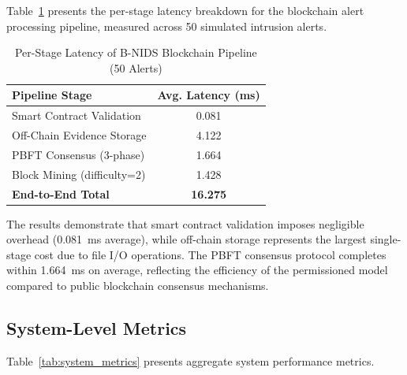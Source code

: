 \documentclass[conference]{IEEEtran}
\begin{document}
Table~\ref{tab:blockchain_latency} presents the per-stage latency breakdown for the blockchain alert processing pipeline, measured across 50 simulated intrusion alerts.

\begin{table}[t]
\centering
\caption{Per-Stage Latency of B-NIDS Blockchain Pipeline (50 Alerts)}
\label{tab:blockchain_latency}
\setlength{\tabcolsep}{4pt}
\begin{tabular}{|l|c|}
\hline
\textbf{Pipeline Stage} & \textbf{Avg. Latency (ms)} \\
\hline
Smart Contract Validation & 0.081 \\
Off-Chain Evidence Storage & 4.122 \\
PBFT Consensus (3-phase) & 1.664 \\
Block Mining (difficulty=2) & 1.428 \\
\hline
\textbf{End-to-End Total} & \textbf{16.275} \\
\hline
\end{tabular}
\end{table}

The results demonstrate that smart contract validation imposes negligible overhead (0.081~ms average), while off-chain storage represents the largest single-stage cost due to file I/O operations. The PBFT consensus protocol completes within 1.664~ms on average, reflecting the efficiency of the permissioned model compared to public blockchain consensus mechanisms.

\subsection{System-Level Metrics}

Table~\ref{tab:system_metrics} presents aggregate system performance metrics.
\end{document}
